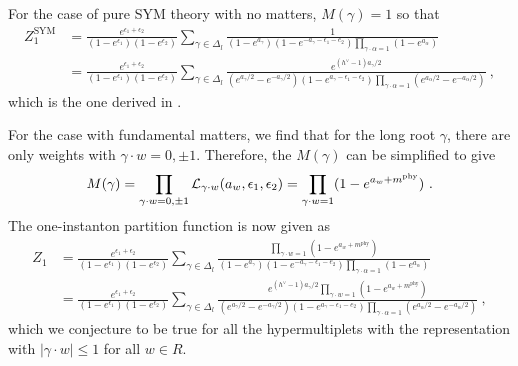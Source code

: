 \documentclass[letterpaper, 11pt]{article}
\newcommand{\nn}{\nonumber}
\def\CL{{\cal L}}
\def\a{\alpha}
\def\g{\gamma}
\def\e{\epsilon}
\begin{document}
For the case of pure SYM theory with no matters, $M(\g)=1$ so that 
\begin{align}
Z_1^{\textrm{SYM}} &= \frac{e^{\e_1+\e_2} }{(1-e^{\e_1})(1-e^{\e_2})} \sum_{\g \in \Delta_l} \frac{1}{ (1 - e^{a_\g})(1-e^{-a_\g-\e_1-e_2}) \prod_{\g \cdot \a = 1} (1-e^{a_\a })} \\
&= \frac{e^{\e_1+\e_2} }{(1-e^{\e_1})(1-e^{\e_2})} \sum_{\g \in \Delta_l} \frac{e^{(h^\vee -1)a_\g/2}}{ (e^{a_\g/2} - e^{-a_\g/2})(1-e^{a_\g-\e_1-\e_2}) {\prod_{\g \cdot \a = 1} (e^{a_\a/2}-e^{-a_\a/2 })} } \ , \nn
\end{align}
which is the one derived in \cite{Keller:2011ek, Keller:2012da}. 

For the case with fundamental matters, we find that for the long root $\g$, there are only weights with $\g \cdot w = 0, \pm 1$. Therefore, the $M(\g)$ can be simplified to give
\begin{align}
 M(\g) = \prod_{\g \cdot w = 0, \pm 1} \CL_{\g \cdot w} (a_w, \e_1, \e_2) = \prod_{\g \cdot w = 1} (1-e^{a_w + m^{\textrm{phy} }}) \ . 
\end{align}
The one-instanton partition function is now given as
\begin{align}
Z_1 &= \frac{e^{\e_1+\e_2} }{(1-e^{\e_1})(1-e^{\e_2})} \sum_{\g \in \Delta_l} \frac{\prod_{\g \cdot w = 1} (1-e^{a_w + m^{\textrm{phy} }}) }{ (1 - e^{a_\g})(1-e^{-a_\g-\e_1-e_2}) \prod_{\g \cdot \a = 1} (1-e^{a_\a })} \\
&= \frac{e^{\e_1+\e_2} }{(1-e^{\e_1})(1-e^{\e_2})} \sum_{\g \in \Delta_l} \frac{e^{(h^\vee -1)a_\g/2} \prod_{\g \cdot w = 1} (1-e^{a_w + m^{\textrm{phy} }}) }{ (e^{a_\g/2} - e^{-a_\g/2})(1-e^{a_\g-\e_1-e_2}) {\prod_{\g \cdot \a = 1} (e^{a_\a/2}-e^{-a_\a/2 })} } \ , \nn
\end{align}
which we conjecture to be true for all the hypermultiplets with the representation with $|\g \cdot w| \le 1$ for all $w \in R$. 
\end{document}
